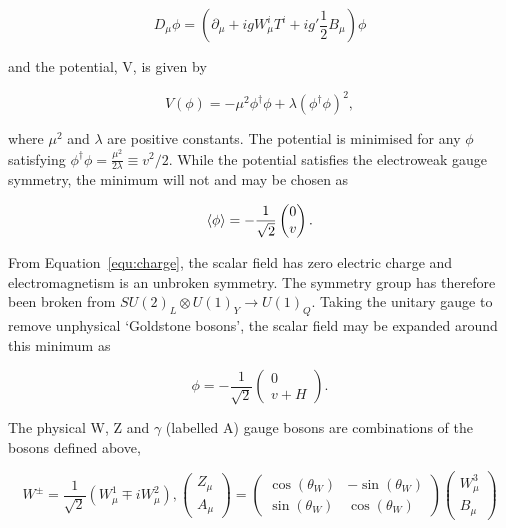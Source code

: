 \begin{equation}
D_{\mu} \phi = (\partial_\mu + igW^i_{\mu}T^i + ig'\frac{1}{2}B_\mu)\phi 
\end{equation}

\noindent and the potential, V, is given by

\begin{equation}
V(\phi) =  - \mu^2\phi^{\dagger}\phi + \lambda \left(\phi^{\dagger}\phi\right)^2,
\end{equation}

\noindent where $\mu^2$ and $\lambda$ are positive constants. The potential is minimised for any $\phi$ satisfying
$\phi^{\dagger}\phi = \frac{\mu^2}{2\lambda} \equiv v^2/2$. While the potential satisfies the 
electroweak gauge symmetry, the minimum will not and may be chosen as

\begin{equation}
\braket{\phi} =  - \frac{1}{\sqrt{2}}\begin{pmatrix} 0 \\ v\end{pmatrix}.
\end{equation}

\noindent From Equation~\ref{equ:charge}, the scalar field has zero electric charge and electromagnetism
is an unbroken symmetry. The symmetry group has therefore been broken 
from $SU(2)_L\otimes U(1)_Y \rightarrow U(1)_Q$. Taking the unitary gauge to remove unphysical `Goldstone 
bosons', the scalar field may be expanded around this minimum as

\begin{equation}
\label{equ:phiExp}
\phi =  - \frac{1}{\sqrt{2}}\begin{pmatrix} 0 \\ v + H\end{pmatrix}.
\end{equation}

\noindent The physical W, Z and $\gamma$ (labelled A) gauge bosons are combinations of the 
bosons defined above,

\begin{equation}
W^{\pm} = \frac{1}{\sqrt{2}} (W^1_\mu \mp i W^2_\mu), \begin{pmatrix} Z_\mu \\ A_\mu\end{pmatrix} = \begin{pmatrix} \cos(\theta_W) & -\sin(\theta_W) \\ \sin(\theta_W) & \cos(\theta_W)\end{pmatrix} \begin{pmatrix} W^3_\mu \\ B_\mu\end{pmatrix}
\end{equation}

